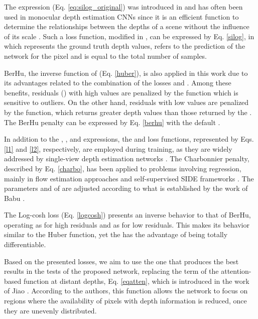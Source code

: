 \documentclass[5p]{elsarticle}
\begin{document}
The  expression (Eq. \ref{eq:silog_original}) was introduced in \cite{eigen2014depth} and has often been used in monocular depth estimation CNNs \cite{lee2019big, cs2018depthnet, carvalho2018regression} since it is an efficient function to determine the relationships between the depths of a scene without the influence of its scale \cite{eigen2014depth}. Such a loss function, modified in \cite{lee2019big}, can be expressed by Eq. \ref{silog}, in which  represents the ground truth depth values,  refers to the prediction of the network for the  pixel and  is equal to the total number of samples.








BerHu, the inverse function of  (Eq. \ref{huber}), is also applied in this work due to its advantages related to the combination of the losses  and . Among these benefits, residuals () with high values are penalized by the function  which is sensitive to outliers. On the other hand, residuals with low values are penalized by the  function, which returns greater depth values than those returned by the . The BerHu penalty can be expressed by Eq. \ref{berhu} with the default .







In addition to the , ,  and  expressions, the  and  loss functions, represented by Eqs. \ref{l1} and \ref{l2}, respectively, are employed during training, as they are widely addressed by single-view depth estimation networks \cite{godard2017unsupervised,ma2018sparse,fu2018deep}. The Charbonnier penalty, described by Eq. \ref{charbo}, has been applied to problems involving regression, mainly in flow estimation approaches \cite{sun2014quantitative} and self-supervised SIDE frameworks \cite{babu2018undemon}. The parameters  and  of  are adjusted according to what is established by the work of Babu \etal \cite{babu2018undemon}.








The Log-cosh loss (Eq. \ref {logcosh}) presents an inverse behavior to that of BerHu, operating as  for high residuals and as  for low residuals. This makes its behavior similar to the Huber function, yet the  has the advantage of being totally differentiable.



Based on the presented losses, we aim to use the one that produces the best results in the tests of the proposed network, replacing the term  of the attention-based function at distant depths, Eq. \ref{eqatten}, which is introduced in the work of Jiao \etal \cite{jiao2018look}. According to the authors, this function allows the network to focus on regions where the availability of pixels with depth information is reduced, once they are unevenly distributed.
\end{document}
